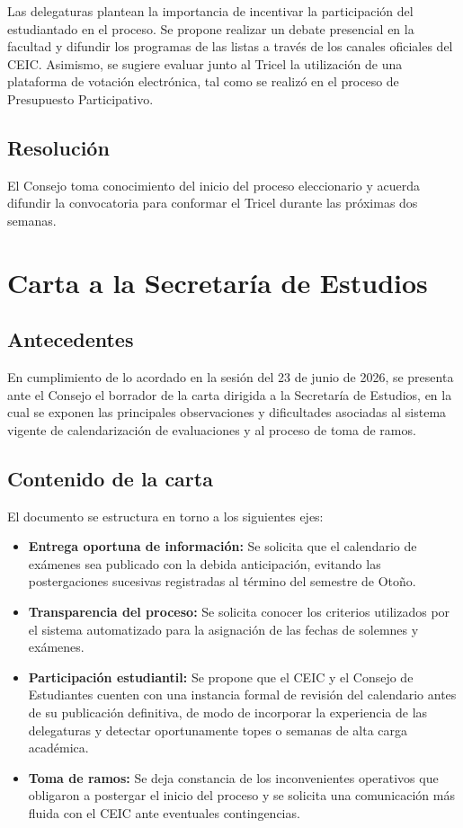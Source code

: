 \documentclass[12pt,letterpaper]{article}
\begin{document}
Las delegaturas plantean la importancia de incentivar la participación del estudiantado en el proceso. Se propone realizar un debate presencial en la facultad y difundir los programas de las listas a través de los canales oficiales del CEIC. Asimismo, se sugiere evaluar junto al Tricel la utilización de una plataforma de votación electrónica, tal como se realizó en el proceso de Presupuesto Participativo.

\subsection{Resolución}

El Consejo toma conocimiento del inicio del proceso eleccionario y acuerda difundir la convocatoria para conformar el Tricel durante las próximas dos semanas.

\section{Carta a la Secretaría de Estudios}

\subsection{Antecedentes}

En cumplimiento de lo acordado en la sesión del 23 de junio de 2026, se presenta ante el Consejo el borrador de la carta dirigida a la Secretaría de Estudios, en la cual se exponen las principales observaciones y dificultades asociadas al sistema vigente de calendarización de evaluaciones y al proceso de toma de ramos.

\subsection{Contenido de la carta}

El documento se estructura en torno a los siguientes ejes:

\begin{itemize}
  \item \textbf{Entrega oportuna de información:} Se solicita que el calendario de exámenes sea publicado con la debida anticipación, evitando las postergaciones sucesivas registradas al término del semestre de Otoño.
  \item \textbf{Transparencia del proceso:} Se solicita conocer los criterios utilizados por el sistema automatizado para la asignación de las fechas de solemnes y exámenes.
  \item \textbf{Participación estudiantil:} Se propone que el CEIC y el Consejo de Estudiantes cuenten con una instancia formal de revisión del calendario antes de su publicación definitiva, de modo de incorporar la experiencia de las delegaturas y detectar oportunamente topes o semanas de alta carga académica.
  \item \textbf{Toma de ramos:} Se deja constancia de los inconvenientes operativos que obligaron a postergar el inicio del proceso y se solicita una comunicación más fluida con el CEIC ante eventuales contingencias.
\end{itemize}
\end{document}
